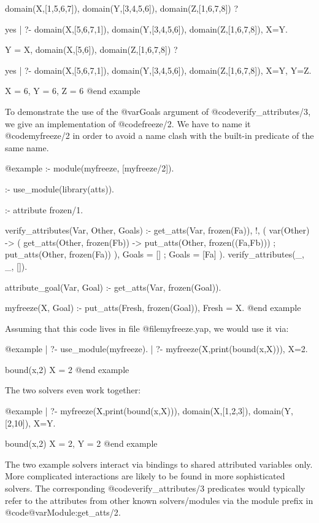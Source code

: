 {{{{{{{{{domain(X,[1,5,6,7]),
domain(Y,[3,4,5,6]),
domain(Z,[1,6,7,8]) ? 

yes
| ?- domain(X,[5,6,7,1]), domain(Y,[3,4,5,6]), domain(Z,[1,6,7,8]), 
     X=Y.

Y = X,
domain(X,[5,6]),
domain(Z,[1,6,7,8]) ? 

yes
| ?- domain(X,[5,6,7,1]), domain(Y,[3,4,5,6]), domain(Z,[1,6,7,8]),
     X=Y, Y=Z.

X = 6,
Y = 6,
Z = 6
@end example

To demonstrate the use of the @var{Goals} argument of
@code{verify_attributes/3}, we give an implementation of
@code{freeze/2}.  We have to name it @code{myfreeze/2} in order to
avoid a name clash with the built-in predicate of the same name.

@example
:- module(myfreeze, [myfreeze/2]).

:- use_module(library(atts)).

:- attribute frozen/1.

verify_attributes(Var, Other, Goals) :-
        get_atts(Var, frozen(Fa)), !,       %
        (   var(Other) ->                   %
            (   get_atts(Other, frozen(Fb)) %
            ->  put_atts(Other, frozen((Fa,Fb))) %
            ;   put_atts(Other, frozen(Fa)) %
            ),
            Goals = []
        ;   Goals = [Fa]
        ).
verify_attributes(_, _, []).

attribute_goal(Var, Goal) :-                %
        get_atts(Var, frozen(Goal)).

myfreeze(X, Goal) :-
        put_atts(Fresh, frozen(Goal)),
        Fresh = X.
@end example

Assuming that this code lives in file @file{myfreeze.yap},
we would use it via:

@example
| ?- use_module(myfreeze).
| ?- myfreeze(X,print(bound(x,X))), X=2.

bound(x,2)                      %
X = 2                           %
@end example

The two solvers even work together:

@example
| ?- myfreeze(X,print(bound(x,X))), domain(X,[1,2,3]),
     domain(Y,[2,10]), X=Y.

bound(x,2)                      %
X = 2,                          %
Y = 2
@end example

The two example solvers interact via bindings to shared attributed
variables only.  More complicated interactions are likely to be found
in more sophisticated solvers.  The corresponding
@code{verify_attributes/3} predicates would typically refer to the
attributes from other known solvers/modules via the module prefix in
@code{@var{Module}:get_atts/2}.

}}}}}}}}}

